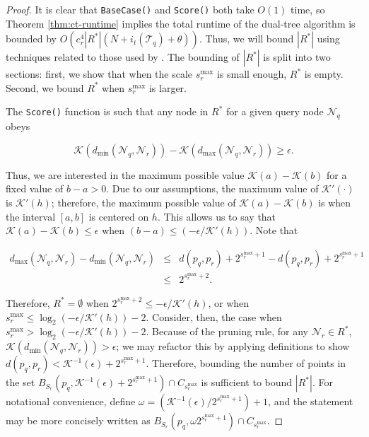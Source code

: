 \begin{proof}
It is clear that \texttt{BaseCase()} and \texttt{Score()} both take $O(1)$ time,
so Theorem \ref{thm:ct-runtime} implies the total runtime of the dual-tree
algorithm is bounded by $O(c_r^4 |R^*| (N + i_t(\mathscr{T}_q) + \theta))$.
Thus, we will bound $|R^*|$ using techniques related to those used by
\citet{ram2009}.  The bounding of $|R^*|$ is split into two sections: first,
we show that when the scale $s_r^{\max}$ is small enough, $R^*$ is empty.
Second, we bound $R^*$ when $s_r^{\max}$ is larger.

The \texttt{Score()} function is such that any node in $R^*$ for a given query
node $\mathscr{N}_q$ obeys

\begin{equation}
\mathcal{K}(d_{\min}(\mathscr{N}_q, \mathscr{N}_r)) -
\mathcal{K}(d_{\max}(\mathscr{N}_q, \mathscr{N}_r))
\ge \epsilon.
\end{equation}

Thus, we are interested in the maximum possible value $\mathcal{K}(a) -
\mathcal{K}(b)$ for a fixed value of $b - a > 0$.  Due to our assumptions, the
maximum value of $\mathcal{K}'(\cdot)$ is
$\mathcal{K}'(h)$; therefore, the maximum possible value of $\mathcal{K}(a) -
\mathcal{K}(b)$ is when the interval $[a, b]$ is centered on $h$.  This allows
us to say that $\mathcal{K}(a) - \mathcal{K}(b) \le \epsilon$ when $(b - a) \le
(-\epsilon / \mathcal{K}'(h))$.  Note that

\begin{eqnarray}
d_{\max}(\mathscr{N}_q, \mathscr{N}_r) - d_{\min}(\mathscr{N}_q, \mathscr{N}_r)
&\le& d(p_q, p_r) + 2^{s_r^{\max} + 1} - d(p_q, p_r) + 2^{s_r^{\max} + 1} \\
 &\le& 2^{s_r^{\max} + 2}.
\end{eqnarray}

Therefore, $R^* = \emptyset$ when
$2^{s_r^{\max} + 2} \le -\epsilon / \mathcal{K}'(h)$, or when
$s_r^{\max} \le \log_2( -\epsilon / \mathcal{K}'(h) ) - 2$.
%
Consider, then, the case when $s_r^{\max} > \log_2( -\epsilon /
\mathcal{K}'(h) ) - 2$.  Because of the pruning rule, for any $\mathscr{N}_r \in
R^*$, $\mathcal{K}(d_{\min}(\mathscr{N}_q, \mathscr{N}_r)) > \epsilon$;
we may refactor this by applying definitions to show
$d(p_q, p_r) < \mathcal{K}^{-1}(\epsilon) + 2^{s_r^{\max} + 1}$.
Therefore, bounding the number of points in the set
$B_{S_r}(p_q, \mathcal{K}^{-1}(\epsilon) + 2^{s_r^{\max} + 1}) \cap
C_{s_r^{\max}}$
is sufficient to bound $|R^*|$.  For notational convenience, define $\omega =
(\mathcal{K}^{-1}(\epsilon) / 2^{s_r^{\max} + 1}) + 1$, and the statement may be
more concisely written as $B_{S_r}(p_q, \omega 2^{s_r^{\max} + 1}) \cap
C_{s_r^{\max}}$.


\end{proof}
